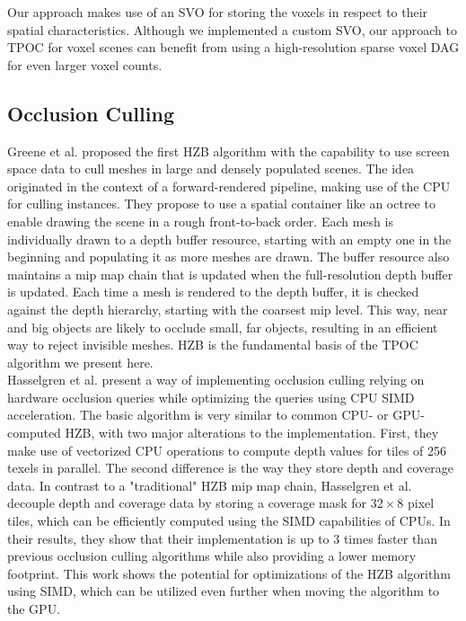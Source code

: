 \documentclass[conference]{IEEEtran}
\begin{document}
\noindent
Our approach makes use of an \ac{SVO} for storing the voxels in respect to their spatial 
characteristics. Although we implemented a custom \ac{SVO}, our approach to \ac{TPOC} for 
voxel scenes can benefit from using a high-resolution sparse voxel \ac{DAG} for even larger 
voxel counts.

\subsection{Occlusion Culling} \label{subsec-occlusion-culling}

\noindent
Greene et al. \cite{b1} proposed the first \ac{HZB} algorithm with the capability to use 
screen space data to cull meshes in large and densely populated scenes. The idea originated 
in the context of a forward-rendered pipeline, making use of the \ac{CPU} for culling instances. 
They propose to use a spatial container like an octree to enable drawing the scene in a rough 
front-to-back order. Each mesh is individually drawn to a depth buffer resource, starting with 
an empty one in the beginning and populating it as more meshes are drawn. The buffer resource 
also maintains a mip map chain that is updated when the full-resolution depth buffer is updated. 
Each time a mesh is rendered to the depth buffer, it is checked against the depth hierarchy, 
starting with the coarsest mip level. This way, near and big objects are likely to occlude small, 
far objects, resulting in an efficient way to reject invisible meshes. \ac{HZB} is the 
fundamental basis of the \ac{TPOC} algorithm we present here.\\

\noindent
Hasselgren et al. \cite{b3} present a way of implementing occlusion culling relying on hardware 
occlusion queries while optimizing the queries using \ac{CPU} \ac{SIMD} acceleration. The basic 
algorithm is very similar to common \ac{CPU}- or \ac{GPU}-computed \ac{HZB}, with two major 
alterations to the implementation. 
First, they make use of vectorized \ac{CPU} operations to compute depth values for tiles of 256 
texels in parallel. The second difference is the way they store depth and coverage data. In contrast 
to a "traditional" \ac{HZB} mip map chain, Hasselgren et al. decouple depth and coverage data by 
storing a coverage mask for $32 \times 8$ pixel tiles, which can be efficiently computed using 
the \ac{SIMD} capabilities of \ac{CPU}s. In their results, they show that their implementation is 
up to 3 times faster than previous occlusion culling algorithms while also providing a lower memory 
footprint. This work shows the potential for optimizations of the \ac{HZB} algorithm using \ac{SIMD}, 
which can be utilized even further when moving the algorithm to the \ac{GPU}. \\
\end{document}

